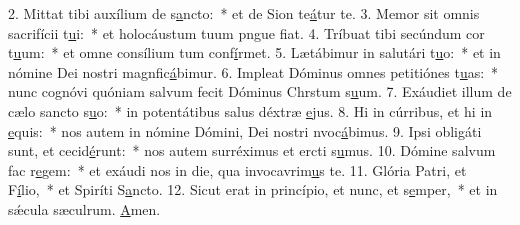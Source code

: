2. Mittat tibi auxílium de s\uline{a}ncto:~* et de Sion te\uline{á}tur te.
3. Memor sit omnis sacrifícii t\uline{u}i:~* et holocáustum tuum pngue f\uline{i}at.
4. Tríbuat tibi secúndum cor t\uline{u}um:~* et omne consílium tum conf\uline{í}rmet.
5. Lætábimur in salutári t\uline{u}o:~* et in nómine Dei nostri magnfic\uline{á}bimur.
6. Impleat Dóminus omnes petitiónes t\uline{u}as:~* nunc cognóvi quóniam salvum fecit Dóminus Chrstum s\uline{u}um.
7. Exáudiet illum de cælo sancto s\uline{u}o:~* in potentátibus salus déxtræ \uline{e}jus.
8. Hi in cúrribus, et hi in \uline{e}quis:~* nos autem in nómine Dómini, Dei nostri nvoc\uline{á}bimus.
9. Ipsi obligáti sunt, et cecid\uline{é}runt:~* nos autem surréximus et ercti s\uline{u}mus.
10. Dómine salvum fac r\uline{e}gem:~* et exáudi nos in die, qua invocavrim\uline{u}s te.
11. Glória Patri, et F\uline{í}lio,~* et Spiríti S\uline{a}ncto.
12. Sicut erat in princípio, et nunc, et s\uline{e}mper,~* et in sǽcula sæculrum. \uline{A}men.
